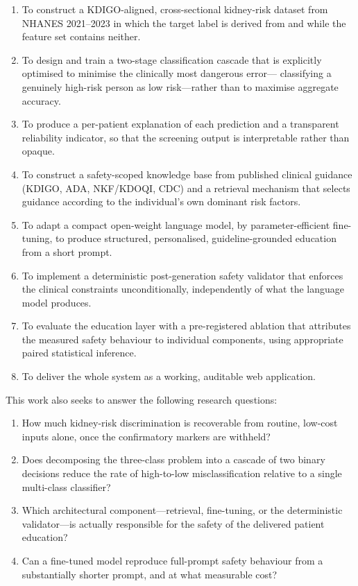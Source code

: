 \begin{enumerate}
  \item To construct a KDIGO-aligned, cross-sectional kidney-risk dataset from
        NHANES 2021--2023 in which the target label is derived from \eGFR{} and
        \UACR{} while the feature set contains neither.
  \item To design and train a two-stage classification cascade that is
        explicitly optimised to minimise the clinically most dangerous error---
        classifying a genuinely high-risk person as low risk---rather than to
        maximise aggregate accuracy.
  \item To produce a per-patient explanation of each prediction and a
        transparent reliability indicator, so that the screening output is
        interpretable rather than opaque.
  \item To construct a safety-scoped knowledge base from published clinical
        guidance (KDIGO, ADA, NKF/KDOQI, CDC) and a retrieval mechanism that
        selects guidance according to the individual's own dominant risk
        factors.
  \item To adapt a compact open-weight language model, by parameter-efficient
        fine-tuning, to produce structured, personalised, guideline-grounded
        education from a short prompt.
  \item To implement a deterministic post-generation safety validator that
        enforces the clinical constraints unconditionally, independently of
        what the language model produces.
  \item To evaluate the education layer with a pre-registered ablation that
        attributes the measured safety behaviour to individual components, using
        appropriate paired statistical inference.
  \item To deliver the whole system as a working, auditable web application.
\end{enumerate}

This work also seeks to answer the following research questions:

\begin{enumerate}
  \item How much kidney-risk discrimination is recoverable from routine, low-cost
        inputs alone, once the confirmatory markers are withheld?
  \item Does decomposing the three-class problem into a cascade of two binary
        decisions reduce the rate of high-to-low misclassification relative to a
        single multi-class classifier?
  \item Which architectural component---retrieval, fine-tuning, or the
        deterministic validator---is actually responsible for the safety of the
        delivered patient education?
  \item Can a fine-tuned model reproduce full-prompt safety behaviour from a
        substantially shorter prompt, and at what measurable cost?
\end{enumerate}

